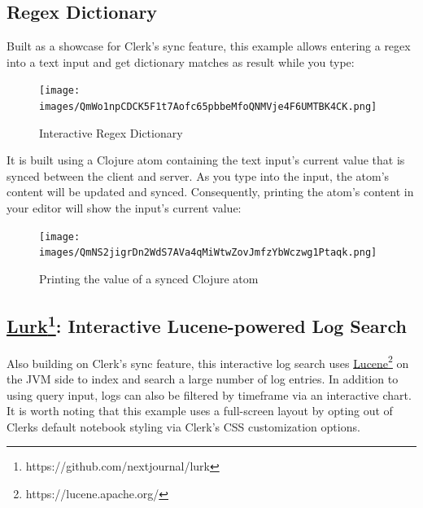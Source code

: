\documentclass[sigconf,screen]{acmart}
\begin{document}
\hypertarget{regex-dictionary}{%
\subsection{Regex Dictionary}\label{regex-dictionary}}

Built as a showcase for Clerk's sync feature, this example allows entering a regex into a text input and get dictionary matches as result while you type:

\begin{figure}
\hypertarget{interactive-regex-dictionary}{%
\centering
\texttt{[image: images/QmWo1npCDCK5F1t7Aofc65pbbeMfoQNMVje4F6UMTBK4CK.png]}
\caption{Interactive Regex Dictionary}\label{interactive-regex-dictionary}
}
\end{figure}

It is built using a Clojure atom containing the text input's current value that is synced between the client and server. As you type into the input, the atom's content will be updated and synced. Consequently, printing the atom's content in your editor will show the input's current value:

\begin{figure}
\hypertarget{printing-the-value-of-a-synced-clojure-atom}{%
\centering
\texttt{[image: images/QmNS2jigrDn2WdS7AVa4qMiWtwZovJmfzYbWczwg1Ptaqk.png]}
\caption{Printing the value of a synced Clojure atom}\label{printing-the-value-of-a-synced-clojure-atom}
}
\end{figure}

\hypertarget{lurk:-interactive-lucene-powered-log-search}{%
\subsection[: Interactive Lucene-powered Log Search]{\texorpdfstring{{\href{https://github.com/nextjournal/lurk}{Lurk}\footnote{https://github.com/nextjournal/lurk}}: Interactive Lucene-powered Log Search}{Lurk: Interactive Lucene-powered Log Search}}\label{lurk:-interactive-lucene-powered-log-search}}

Also building on Clerk's sync feature, this interactive log search uses {\href{https://lucene.apache.org/}{Lucene}\footnote{https://lucene.apache.org/}} on the JVM side to index and search a large number of log entries. In addition to using query input, logs can also be filtered by timeframe via an interactive chart. It is worth noting that this example uses a full-screen layout by opting out of Clerk\textquotesingle s default notebook styling via Clerk's CSS customization options.
\end{document}
